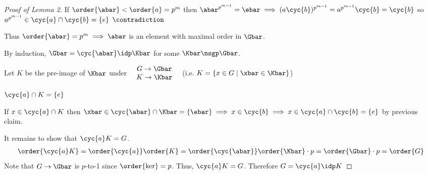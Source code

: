\begin{proof}[Proof of Lemma 2]
     If \(\order{\abar} < \order{a} = p^m\) then \(\abar^{p^{m-1}} = \ebar \implies (a\cyc{b})^{p^{m-1}} = a^{p^{m-1}}\cyc{b} = \cyc{b}\) so \(a^{p^{m-1}}\in\cyc{a}\cap\cyc{b}=\{e\}\) \(\contradiction\)

     Thus \(\order{\abar} = p^m \implies \abar\) is an element with maximal order in \(\Gbar\).

     By induction, \(\Gbar = \cyc{\abar}\idp\Kbar\) for some \(\Kbar\nsgp\Gbar\).

     Let \(K\) be the pre-image of \(\Kbar\) under \(\quad \begin{matrix}
         G\to \Gbar \\
         K\to\Kbar
     \end{matrix}\quad \)
     (i.e. \(K = \{x\in G \mid\xbar\in\Kbar\}\))

     \begin{claim}
         \(\cyc{a}\cap K = \{e\}\)
     \end{claim}
     \begin{subproof}
         \vspace*{-1em}If \(x\in\cyc{a}\cap K \) then \(\xbar \in\cyc{\abar}\cap\Kbar = \{\ebar\} \implies x\in\cyc{b} \implies x\in\cyc{a}\cap\cyc{b} = \{e\}\) by previous claim.
     \end{subproof}
     It remains to show that \(\cyc{a}K = G\).
     \begin{align*}
         \order{\cyc{a}K} = \order{\cyc{a}}\order{K} = \order{\cyc{\abar}}\order{\Kbar}\cdot p = \order{\Gbar}\cdot p = \order{G}
     \end{align*}
     Note that \(G\to \Gbar\) is \(p\)-to-1 since \(\order{\ker} = p\).  Thus, \(\cyc{a}K = G\).  Therefore \(G = \cyc{a}\idp K\)
 \end{proof}